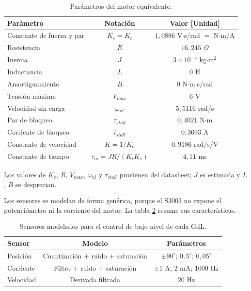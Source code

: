 \documentclass[10pt, letterpaper]{article}
\begin{document}
\begin{table}[H]
    \centering
    \caption{Parámetros del motor equivalente.}
    \label{tab:parametros}
    \small
    \begin{tabular}{lcc}
        \toprule
        Parámetro & Notación & Valor [Unidad] \\
        \midrule
        Constante de fuerza y par & $K_e = K_t$ & $1{,}0886$ V$\cdot$s/rad $=$ N$\cdot$m/A \\
        Resistencia & $R$ & $16{,}245$ $\Omega$ \\
        Inercia & $J$ & $3\times10^{-4}$ kg$\cdot$m$^2$ \\
        Inductancia & $L$ & $0$ H \\
        Amortiguamiento & $B$ & $0$ N$\cdot$m$\cdot$s/rad \\
        Tensión máxima & $V_{max}$ & $6$ V \\
        Velocidad sin carga & $\omega_{nl}$ & $5{,}5116$ rad/s \\
        Par de bloqueo & $\tau_{stall}$ & $0{,}4021$ N$\cdot$m \\
        Corriente de bloqueo & $i_{stall}$ & $0{,}3693$ A \\
        Constante de velocidad & $K = 1/K_e$ & $0{,}9186$ rad/s/V \\
        Constante de tiempo & $\tau_m = JR/(K_tK_e)$ & $4{,}11$ ms \\
        \bottomrule
    \end{tabular}
\end{table}

Los valores de $K_e$, $R$, $V_{max}$, $\omega_{nl}$ y $\tau_{stall}$ provienen
del datasheet; $J$ es estimada y $L$, $B$ se desprecian.

Los sensores se modelan de forma genérica, porque el S3003 no expone el
potenciómetro ni la corriente del motor. La tabla \ref{tab:sensores} resume sus
características.

\begin{table}[H]
    \centering
    \caption{Sensores modelados para el control de bajo nivel de cada GdL.}
    \label{tab:sensores}
    \small
    \begin{tabular}{lcc}
        \toprule
        Sensor & Modelo & Parámetros \\
        \midrule
        Posición  & Cuantización $+$ ruido $+$ saturación & $\pm90^\circ$; $0{,}5^\circ$; $0{,}05^\circ$ \\
        Corriente & Filtro $+$ ruido $+$ saturación & $\pm1$ A; $2$ mA; $1000$ Hz \\
        Velocidad & Derivada filtrada & $20$ Hz \\
        \bottomrule
    \end{tabular}
\end{table}
\end{document}
